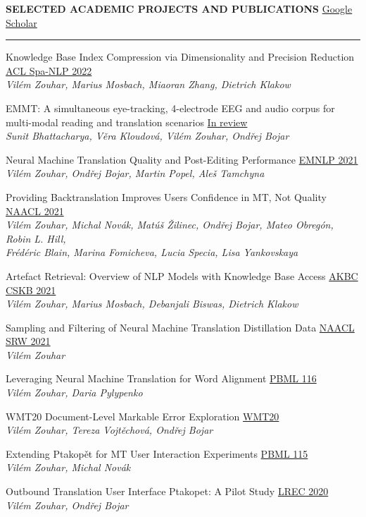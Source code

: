 \documentclass[11pt,a4paper]{article} %
\newcommand{\hSectionI}[2]{
    \medskip
    \MakeUppercase{\bf #1}
    \hfill
    #2
    \medskip
    \hrule
}
\newcommand{\hSubsectionB}[3]{
    {#1} \hfill {\footnotesize #2}\hspace{-1cm}\\
    \vspace{-0.2cm} \hspace{-0.17cm}\textit{\footnotesize #3}
    \vspace{0.05cm}
}
\begin{document}
\hSectionI{Selected Academic Projects and Publications}{\href{https://scholar.google.com/citations?user=2EUDwtkAAAAJ}{Google Scholar}\hspace{-1.12cm}}

\hSubsectionB
{Knowledge Base Index Compression via Dimensionality and Precision Reduction}
{\href{https://arxiv.org/abs/2204.02906}{ACL Spa-NLP 2022}}
{Vilém Zouhar, Marius Mosbach, Miaoran Zhang, Dietrich Klakow}

\hSubsectionB
{EMMT: A simultaneous eye-tracking, 4-electrode EEG and audio corpus for multi-modal reading and translation scenarios}
{\href{https://arxiv.org/abs/2204.02905}{In review}}
{Sunit Bhattacharya, Věra Kloudová, Vilém Zouhar, Ondřej Bojar}

\hSubsectionB
{Neural Machine Translation Quality and Post-Editing Performance}
{\href{https://arxiv.org/pdf/2109.05016.pdf}{EMNLP 2021}}
{Vilém Zouhar, Ondřej Bojar, Martin Popel, Aleš Tamchyna}

\hSubsectionB
{Providing Backtranslation Improves Users Confidence in MT, Not Quality}
{\href{https://aclanthology.org/2021.naacl-main.14/}{NAACL 2021}}
{Vilém Zouhar, Michal Novák, Matúš Žilinec, Ondřej Bojar, Mateo Obregón, Robin L. Hill,\\ Frédéric Blain, Marina Fomicheva, Lucia Specia, Lisa Yankovskaya}
\vspace{-0.11cm}

\hSubsectionB
{Artefact Retrieval: Overview of NLP Models with Knowledge Base Access}
{\href{https://openreview.net/forum?id=9_oCNR6R9l2}{AKBC CSKB 2021}}
{Vilém Zouhar, Marius Mosbach, Debanjali Biswas, Dietrich Klakow}

\hSubsectionB
{Sampling and Filtering of Neural Machine Translation Distillation Data}
{\href{https://aclanthology.org/2021.naacl-srw.1/}{NAACL SRW 2021}}
{Vilém Zouhar}

\hSubsectionB
{Leveraging Neural Machine Translation for Word Alignment}
{\href{https://ufal.mff.cuni.cz/pbml/116/art-zouhar-pylypenko.pdf}{PBML 116}}
{Vilém Zouhar, Daria Pylypenko}

\hSubsectionB
{WMT20 Document-Level Markable Error Exploration}
{\href{https://aclanthology.org/2020.wmt-1.41/}{WMT20}}
{Vilém Zouhar, Tereza Vojtěchová, Ondřej Bojar}

\hSubsectionB
{Extending Ptakopět for MT User Interaction Experiments}
{\href{https://ufal.mff.cuni.cz/pbml/115/art-zouhar-novak.pdf}{PBML 115}}
{Vilém Zouhar, Michal Novák}

\hSubsectionB
{Outbound Translation User Interface Ptakopet: A Pilot Study}
{\href{https://aclanthology.org/2020.lrec-1.860/}{LREC 2020}}
{Vilém Zouhar, Ondřej Bojar}
\end{document}
